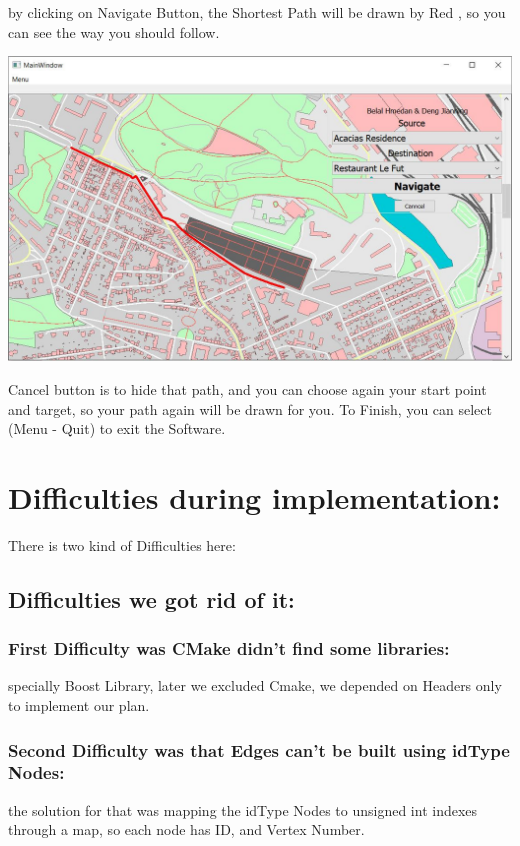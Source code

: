 \documentclass[a4paper,english]{book}
\begin{document}
by clicking on Navigate Button, the Shortest Path will be drawn by Red , so you can see the way you should follow.
\begin{center}
\includegraphics[width=.6\textwidth]{GUI_Map2.JPG}
\end{center}
Cancel button is to hide that path, and you can choose again your start point and target, so your path again will be drawn for you.
To Finish, you can select (Menu - Quit) to exit the Software.
\section{Difficulties during implementation:}
There is two kind of Difficulties here:
\subsection{Difficulties we got rid of it:} 
\subsubsection{First Difficulty was CMake didn’t find some libraries:}
specially Boost Library, later we excluded Cmake, we depended on Headers only to implement our plan.
\subsubsection{Second Difficulty was that Edges can’t be built using idType Nodes:} the solution for that was mapping the idType Nodes to unsigned int indexes through a map, so each node has ID, and Vertex Number.
\end{document}
